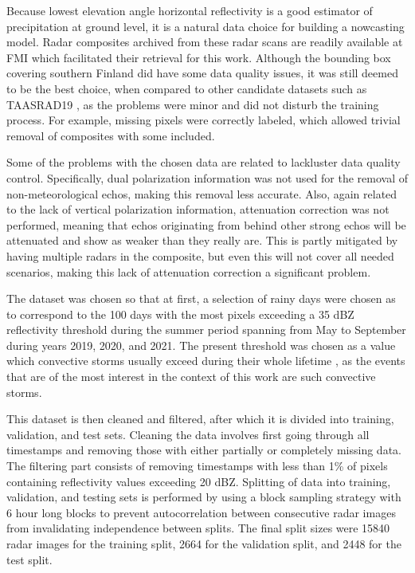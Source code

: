 Because lowest elevation angle horizontal reflectivity is a good estimator of precipitation at ground level, it is a natural data choice for building a nowcasting model. Radar composites archived from these radar scans are readily available at FMI which facilitated their retrieval for this work. Although the bounding box covering southern Finland did have some data quality issues, it was still deemed to be the best choice, when compared to other candidate datasets such as TAASRAD19 \cite{franch_taasrad19_2020}, as the problems were minor and did not disturb the training process. For example, missing pixels were correctly labeled, which allowed trivial removal of composites with some included. 

Some of the problems with the chosen data are related to lackluster data quality control. Specifically, dual polarization information was not used for the removal of non-meteorological echos, making this removal less accurate. Also, again related to the lack of vertical polarization information, attenuation correction was not performed, meaning that echos originating from behind other strong echos will be attenuated and show as weaker than they really are. This is partly mitigated by having multiple radars in the composite, but even this will not cover all needed scenarios, making this lack of attenuation correction a significant problem. 



The dataset was chosen so that at first, a selection of rainy days were chosen as to correspond to the 100 days with the most pixels exceeding a 35 dBZ reflectivity threshold during the summer period spanning from May to September during years 2019, 2020, and 2021. The present threshold was chosen as a value which convective storms usually exceed during their whole lifetime \cite{voormansik_thunderstorm_2017}, as the events that are of the most interest in the context of this work are such convective storms.

This dataset is then cleaned and filtered, after which it is divided into training, validation, and test sets. Cleaning the data involves first going through all timestamps and removing those with either partially or completely missing data. The filtering part consists of removing timestamps with less than 1\% of pixels containing reflectivity values exceeding 20 dBZ. Splitting of data into training, validation, and testing sets is performed by using a block sampling strategy \cite{schultz_can_2021} with 6 hour long blocks to prevent autocorrelation between consecutive radar images from invalidating independence between splits. The final split sizes were 15840 radar images for the training split, 2664 for the validation split, and 2448 for the test split. 

